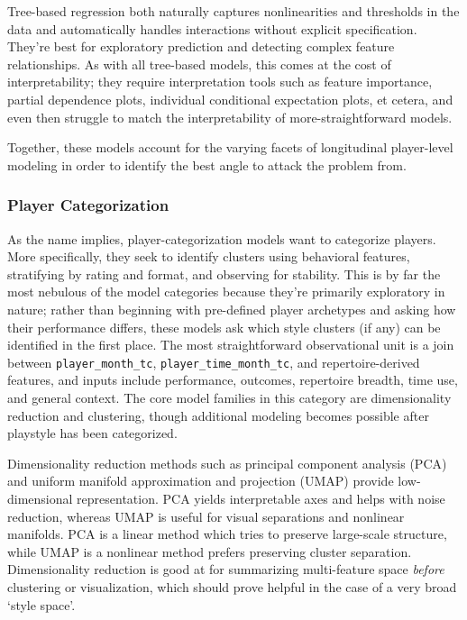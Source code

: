 \documentclass[
  12pt]{article}
\begin{document}
Tree-based regression both naturally captures nonlinearities and
thresholds in the data and automatically handles interactions without
explicit specification. They're best for exploratory prediction and
detecting complex feature relationships. As with all tree-based models,
this comes at the cost of interpretability; they require interpretation
tools such as feature importance, partial dependence plots, individual
conditional expectation plots, et cetera, and even then struggle to
match the interpretability of more-straightforward models.

Together, these models account for the varying facets of longitudinal
player-level modeling in order to identify the best angle to attack the
problem from.

\subsubsection{Player Categorization}\label{player-categorization}

As the name implies, player-categorization models want to categorize
players. More specifically, they seek to identify clusters using
behavioral features, stratifying by rating and format, and observing for
stability. This is by far the most nebulous of the model categories
because they're primarily exploratory in nature; rather than beginning
with pre-defined player archetypes and asking how their performance
differs, these models ask which style clusters (if any) can be
identified in the first place. The most straightforward observational
unit is a join between \texttt{player\_month\_tc},
\texttt{player\_time\_month\_tc}, and repertoire-derived features, and
inputs include performance, outcomes, repertoire breadth, time use, and
general context. The core model families in this category are
dimensionality reduction and clustering, though additional modeling
becomes possible after playstyle has been categorized.

Dimensionality reduction methods such as principal component analysis
(PCA) and uniform manifold approximation and projection (UMAP) provide
low-dimensional representation. PCA yields interpretable axes and helps
with noise reduction, whereas UMAP is useful for visual separations and
nonlinear manifolds. PCA is a linear method which tries to preserve
large-scale structure, while UMAP is a nonlinear method prefers
preserving cluster separation. Dimensionality reduction is good at for
summarizing multi-feature space \emph{before} clustering or
visualization, which should prove helpful in the case of a very broad
`style space'.
\end{document}
